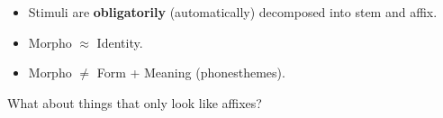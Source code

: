 {\pause

	\begin{itemize} \tightlist
		\item Stimuli are \alert<2>{\textbf{obligatorily}} (automatically) decomposed into stem and affix.
		\item Morpho $\approx$ Identity.
		\item Morpho $\ne$ Form + Meaning (phonesthemes).
	\end{itemize}

	 What about things that only look like affixes?

}


%	
%
%	


